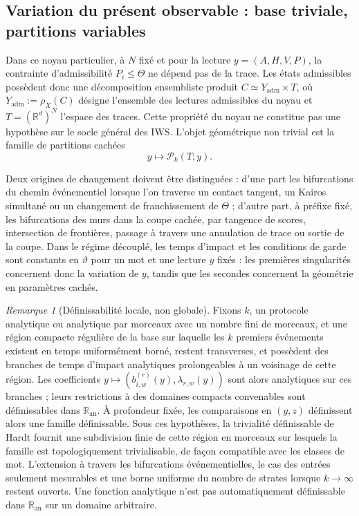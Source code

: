 \documentclass[11pt,a4paper]{article}
\theoremstyle{definition}
\theoremstyle{remark}
\newtheorem{remark}[definition]{Remarque}
\begin{document}
\subsection{Variation du présent observable : base triviale, partitions variables}

Dans ce noyau particulier, à $N$ fixé et pour la lecture $y=(A,H,V,P)$, la contrainte d'admissibilité $P_i\le\Theta$ ne dépend pas de la trace. Les états admissibles possèdent donc une décomposition ensembliste produit $C\simeq Y_{\mathrm{adm}}\times T$, où $Y_{\mathrm{adm}}:=\rho_X(C)$ désigne l'ensemble des lectures admissibles du noyau et $T=(\mathbb R^d)^N$ l'espace des traces. Cette propriété du noyau ne constitue pas une hypothèse sur le socle général des IWS. L'objet géométrique non trivial est la famille de partitions cachées
\[
 \boxed{y\longmapsto\mathcal P_k(T;y).}
\]

Deux origines de changement doivent être distinguées : d'une part les bifurcations du chemin événementiel lorsque l'on traverse un contact tangent, un Kairos simultané ou un changement de franchissement de $\Theta$ ; d'autre part, à préfixe fixé, les bifurcations des murs dans la coupe cachée, par tangence de scores, intersection de frontières, passage à travers une annulation de trace ou sortie de la coupe. Dans le régime découplé, les temps d'impact et les conditions de garde sont constants en $\vartheta$ pour un mot et une lecture $y$ fixés : les premières singularités concernent donc la variation de $y$, tandis que les secondes concernent la géométrie en paramètres cachés.

\begin{remark}[Définissabilité locale, non globale]
\label{rem:definissabilite-locale}
Fixons $k$, un protocole analytique ou analytique par morceaux avec un nombre fini de morceaux, et une région compacte régulière de la base sur laquelle les $k$ premiers événements existent en temps uniformément borné, restent transverses, et possèdent des branches de temps d'impact analytiques prolongeables à un voisinage de cette région. Les coefficients $y\mapsto(b_{i,w}^{(r)}(y),\lambda_{r,w}(y))$ sont alors analytiques sur ces branches ; leurs restrictions à des domaines compacts convenables sont définissables dans $\mathbb R_{\mathrm{an}}$. À profondeur fixée, les comparaisons en $(y,z)$ définissent alors une famille définissable. Sous ces hypothèses, la trivialité définissable de Hardt fournit une subdivision finie de cette région en morceaux sur lesquels la famille est topologiquement trivialisable, de façon compatible avec les classes de mot. L'extension à travers les bifurcations événementielles, le cas des entrées seulement mesurables et une borne uniforme du nombre de strates lorsque $k\to\infty$ restent ouverts. Une fonction analytique n'est pas automatiquement définissable dans $\mathbb R_{\mathrm{an}}$ sur un domaine arbitraire.
\end{remark}
\end{document}
